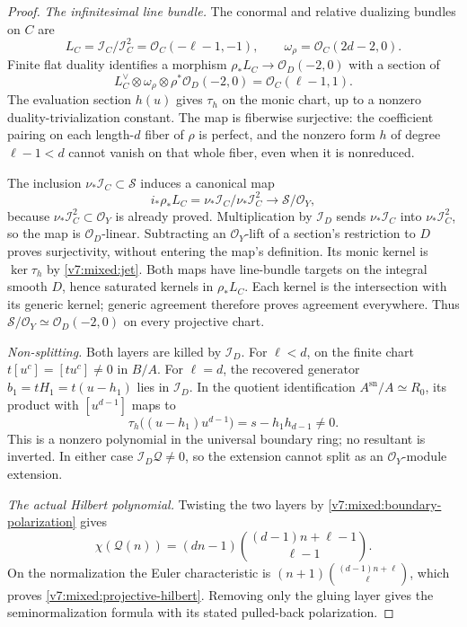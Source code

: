 \documentclass[10pt,fleqn]{article}
\numberwithin{equation}{section}
\begin{document}
\begin{proof}
\textit{The infinitesimal line bundle.}
The conormal and relative dualizing bundles on $C$ are
\[
 L_C=\mathcal I_C/\mathcal I_C^2=\mathcal O_C(-\ell-1,-1),
 \qquad \omega_\rho=\mathcal O_C(2d-2,0).
\]
Finite flat duality \cite[Tags~0BUZ and 0BVE]{Stacks} identifies a morphism
$\rho_*L_C\to\mathcal O_D(-2,0)$ with a section of
\[
 L_C^\vee\otimes\omega_\rho\otimes\rho^*\mathcal O_D(-2,0)
       =\mathcal O_C(\ell-1,1).
\]
The evaluation section $h(u)$ gives $\tau_h$ on the monic chart,
up to a nonzero duality-trivialization constant.  The map is fiberwise
surjective: the coefficient pairing on each length-$d$ fiber of $\rho$
is perfect, and the nonzero form $h$ of degree $\ell-1<d$ cannot vanish
on that whole fiber, even when it is nonreduced.

The inclusion $\nu_*\mathcal I_C\subset\mathcal S$ induces a canonical map
\[
 i_*\rho_*L_C=\nu_*\mathcal I_C/\nu_*\mathcal I_C^2
       \longrightarrow\mathcal S/\mathcal O_Y,
\]
because $\nu_*\mathcal I_C^2\subset\mathcal O_Y$ is already proved.
Multiplication by $\mathcal I_D$ sends $\nu_*\mathcal I_C$ into
$\nu_*\mathcal I_C^2$, so the map is $\mathcal O_D$-linear.  Subtracting
an $\mathcal O_Y$-lift of a section's restriction to $D$ proves
surjectivity, without entering the map's definition.  Its monic kernel
is $\ker\tau_h$ by \eqref{v7:mixed:jet}.  Both maps have line-bundle
targets on the integral smooth $D$, hence saturated kernels in
$\rho_*L_C$.  Each kernel is the intersection with its generic kernel;
generic agreement therefore proves agreement everywhere.  Thus
$\mathcal S/\mathcal O_Y\simeq\mathcal O_D(-2,0)$ on every
projective chart.

\textit{Non-splitting.}
Both layers are killed by $\mathcal I_D$.
For $\ell<d$, on the finite chart $t[u^c]=[tu^c]\ne0$ in $B/A$.
For $\ell=d$, the recovered generator $b_1=tH_1=t(u-h_1)$
lies in $\mathcal I_D$.  In the quotient identification
$A^{\mathrm{sn}}/A\simeq R_0$, its product with $[u^{d-1}]$ maps to
\[
 \tau_h\bigl((u-h_1)u^{d-1}\bigr)=s-h_1h_{d-1}\ne0.
\]
This is a nonzero polynomial in the universal boundary ring; no
resultant is inverted.
In either case $\mathcal I_D\mathcal Q\ne0$, so the extension cannot
split as an $\mathcal O_Y$-module extension.

\textit{The actual Hilbert polynomial.}
Twisting the two layers by \eqref{v7:mixed:boundary-polarization} gives
\[
 \chi(\mathcal Q(n))=(dn-1)
                 \binom{(d-1)n+\ell-1}{\ell-1}.
\]
On the normalization the Euler characteristic is
$(n+1)\binom{(d-1)n+\ell}{\ell}$, which proves
\eqref{v7:mixed:projective-hilbert}.  Removing only the gluing layer gives
the seminormalization formula with its stated pulled-back polarization.
\end{proof}
\end{document}

